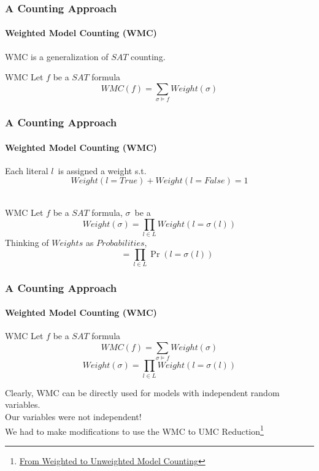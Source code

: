 \documentclass{beamer}
\begin{document}
\begin{frame}
\frametitle{A Counting Approach}
\framesubtitle{Weighted Model Counting (WMC)}

	WMC is a generalization of $SAT$ counting.\\
	\begin{block}{WMC}
	Let $f$ be a $SAT$ formula
		$$WMC(f) = \sum_{\sigma \vDash f}Weight(\sigma)$$
	\end{block}
\end{frame}

\begin{frame}
\frametitle{A Counting Approach}
\framesubtitle{Weighted Model Counting (WMC)}

	Each literal $l$\ is assigned a weight s.t.\\
	\vspace*{-5pt}
	$$Weight(l=True) + Weight(l=False) = 1$$\\
	\begin{block}{WMC}
	Let $f$ be a $SAT$ formula, $\sigma$\ be a
		$$Weight(\sigma) = \prod_{l \in L}{Weight(l=\sigma(l))}$$
	Thinking of $Weights$ as $Probabilities$,
		$$\ \ \ \ \ \ \ \  = \prod_{l \in L}{\Pr(l=\sigma(l))}$$
	\end{block}
\end{frame}

\begin{frame}
\frametitle{A Counting Approach}
\framesubtitle{Weighted Model Counting (WMC)}

	\begin{block}{WMC}
	Let $f$ be a $SAT$ formula
		$$WMC(f) = \sum_{\sigma \vDash f}Weight(\sigma)$$
		$$Weight(\sigma) = \prod_{l \in L}{Weight(l=\sigma(l))}$$
	\end{block}
	Clearly, WMC can be directly used for models with independent random variables.\\
	\pause
	\color{red}
	Our variables were not independent!\\
	We had to make modifications to use the WMC to UMC Reduction\footnote{\href{http://ijcai.org/Proceedings/15/Papers/103.pdf}{From Weighted to Unweighted Model Counting}}\\
\end{frame}
\end{document}
